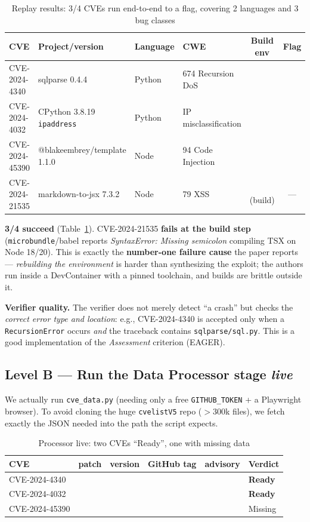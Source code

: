 \documentclass[conference,10pt,a4paper]{IEEEtran}
\newcommand{\yes}{\textcolor{ok}{\checkmark}}
\newcommand{\no}{\textcolor{bad}{\texttimes}}
\newcommand{\code}[1]{\texttt{\small #1}}
\begin{document}
\begin{table}[t]
\caption{Replay results: 3/4 CVEs run end-to-end to a flag, covering 2 languages and 3 bug classes}
\label{tab:replay}
\centering\footnotesize
\begin{tabular}{@{}llll c c@{}}
\toprule
CVE & Project/version & Language & CWE & Build env & Flag \\ \midrule
CVE-2024-4340 & sqlparse 0.4.4 & Python & 674 Recursion DoS & \yes & \yes \\
CVE-2024-4032 & CPython 3.8.19 \code{ipaddress} & Python & IP misclassification & \yes & \yes \\
CVE-2024-45390 & @blakeembrey/template 1.1.0 & Node & 94 Code Injection & \yes & \yes \\
CVE-2024-21535 & markdown-to-jsx 7.3.2 & Node & 79 XSS & \no\,(build) & --- \\ \bottomrule
\end{tabular}
\end{table}

\textbf{3/4 succeed} (Table~\ref{tab:replay}). CVE-2024-21535 \textbf{fails at the build step} (\code{microbundle}/babel reports \textit{SyntaxError: Missing semicolon} compiling TSX on Node 18/20). This is exactly the \textbf{number-one failure cause} the paper reports --- \textit{rebuilding the environment} is harder than synthesizing the exploit; the authors run inside a DevContainer with a pinned toolchain, and builds are brittle outside it.

\textbf{Verifier quality.} The verifier does not merely detect ``a crash'' but checks the \textit{correct error type and location}: e.g., CVE-2024-4340 is accepted only when a \code{RecursionError} occurs \textit{and} the traceback contains \code{sqlparse/sql.py}. This is a good implementation of the \textit{Assessment} criterion (EAGER).

\subsection{Level B --- Run the Data Processor stage \textit{live}}
We actually run \code{cve\_data.py} (needing only a free \code{GITHUB\_TOKEN} + a Playwright browser). To avoid cloning the huge \code{cvelistV5} repo ($>$300k files), we fetch exactly the JSON needed into the path the script expects.

\begin{table}[t]
\caption{Processor live: two CVEs ``Ready'', one with missing data}
\label{tab:proc}
\centering\footnotesize
\begin{tabular}{@{}lccccl@{}}
\toprule
CVE & patch & version & GitHub tag & advisory & Verdict \\ \midrule
CVE-2024-4340 & \yes & \yes & \yes & \yes & \textbf{Ready} \\
CVE-2024-4032 & \yes & \yes & \yes & \yes & \textbf{Ready} \\
CVE-2024-45390 & \yes & \yes & \no & \yes & Missing \\ \bottomrule
\end{tabular}
\end{table}
\end{document}
